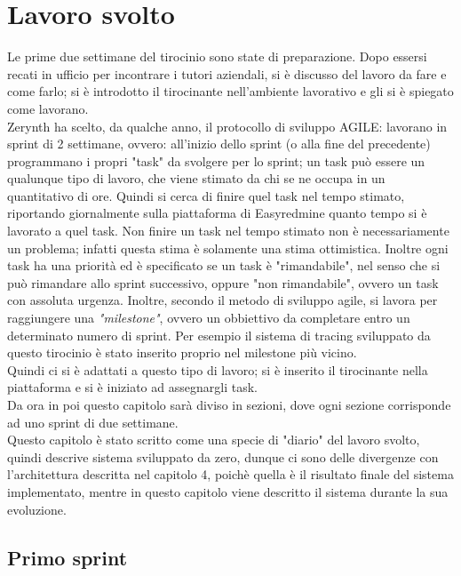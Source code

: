 \documentclass[a4paper,12pt,titlepage,italian,openany]{report}
\begin{document}
\chapter{Lavoro svolto}
Le prime due settimane del tirocinio sono state di preparazione. Dopo essersi recati in ufficio per incontrare i tutori aziendali, si è discusso
del lavoro da fare e come farlo; si è introdotto il tirocinante nell'ambiente lavorativo e gli si è spiegato come lavorano.\\
Zerynth ha scelto, da qualche anno, il protocollo di sviluppo AGILE: lavorano in sprint di 2 settimane, ovvero: all'inizio dello sprint (o alla fine del precedente) programmano i propri "task" da svolgere per lo sprint; un task può essere un qualunque tipo di lavoro, che viene stimato da chi se ne occupa in un quantitativo di ore. Quindi si cerca di finire quel task nel tempo stimato, riportando giornalmente sulla piattaforma di Easyredmine quanto tempo si è lavorato a quel task.
Non finire un task nel tempo stimato non è necessariamente un problema; infatti questa stima è solamente una stima ottimistica. Inoltre ogni task ha una priorità ed è specificato se un task è "rimandabile", nel senso che si può rimandare allo sprint successivo, oppure "non rimandabile", ovvero un task con assoluta urgenza. Inoltre, secondo il metodo di sviluppo agile,  si lavora per raggiungere una \textit{"milestone"}, ovvero un obbiettivo da completare entro un determinato numero di sprint. Per esempio il sistema di tracing sviluppato da questo tirocinio è stato inserito proprio nel milestone più  vicino.\\
Quindi ci si è adattati a questo tipo di lavoro; si è inserito il tirocinante nella piattaforma e si è iniziato ad assegnargli task.\\
Da ora in poi questo capitolo sarà diviso in sezioni, dove ogni sezione corrisponde ad uno sprint di due settimane.
\\Questo capitolo è stato scritto come una specie di "diario" del lavoro svolto, quindi descrive sistema sviluppato da zero, dunque ci sono delle divergenze con l'architettura descritta nel capitolo 4, poichè quella è il risultato finale del sistema implementato, mentre in questo capitolo viene descritto il sistema durante la sua evoluzione.
\section{Primo sprint}
\end{document}
